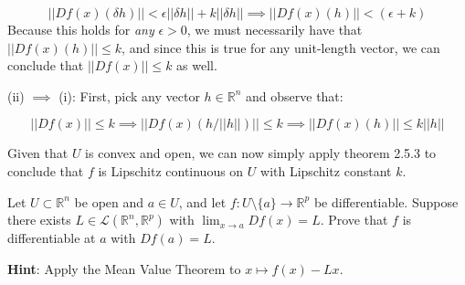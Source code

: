 \begin{solution}
    $$\lvert \lvert Df(x)(\delta h) \rvert \rvert < \epsilon \lvert \lvert \delta h \rvert \rvert + k \lvert \lvert \delta h \rvert \rvert \implies \lvert \lvert Df(x)(h) \rvert \rvert < (\epsilon + k)$$
    Because this holds for \textit{any} $\epsilon > 0$, we must necessarily have that $\lvert \lvert Df(x)(h) \rvert \rvert \leq k$, and since this is true for any unit-length vector, we can conclude that $\lvert \lvert Df(x) \rvert \rvert \leq k$ as well.

    (ii) $\implies$ (i): First, pick any vector $h \in \mathbb{R}^n$ and observe that:

    $$\lvert \lvert Df(x) \rvert \rvert \leq k \implies \lvert \lvert Df(x)(h/ \lvert \lvert h \rvert \rvert) \rvert \rvert \leq k \implies \lvert \lvert Df(x)(h) \rvert \rvert \leq k \lvert \lvert h \rvert \rvert$$ 

    Given that $U$ is convex and open, we can now simply apply theorem 2.5.3 to conclude that $f$ is Lipschitz continuous on $U$ with Lipschitz constant $k$.
\end{solution}

\begin{exercise}{25}
    Let $U \subset \mathbb{R}^n$ be open and $a \in U$, and let $f: U \setminus \{a\} \rightarrow \mathbb{R}^p$ be differentiable.
    Suppose there exists $L \in \mathcal{L}(\mathbb{R}^n, \mathbb{R}^p)$ with $\lim_{x \rightarrow a} Df(x) = L$.
    Prove that $f$ is differentiable at $a$ with $Df(a) = L$.

    \textbf{Hint}: Apply the Mean Value Theorem to $x \mapsto f(x) - Lx$.
\end{exercise}

